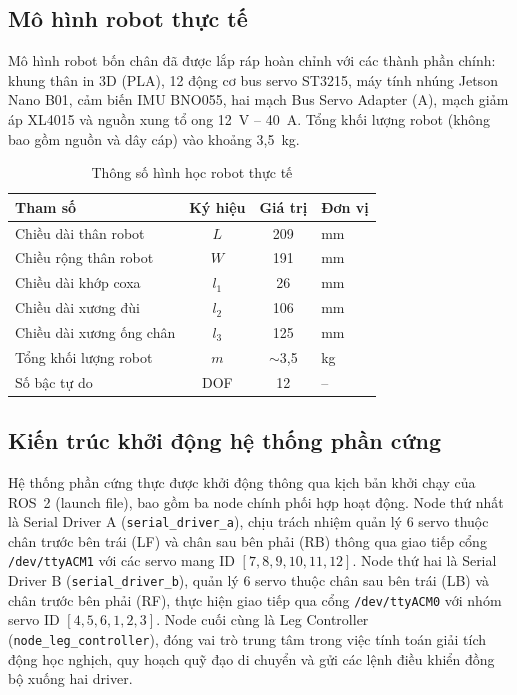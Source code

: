 \subsection{Mô hình robot thực tế}

Mô hình robot bốn chân đã được lắp ráp hoàn chỉnh với các thành phần chính: khung thân in 3D (PLA), 12 động cơ bus servo ST3215, máy tính nhúng Jetson Nano B01, cảm biến IMU BNO055, hai mạch Bus Servo Adapter (A), mạch giảm áp XL4015 và nguồn xung tổ ong 12~V -- 40~A. Tổng khối lượng robot (không bao gồm nguồn và dây cáp) vào khoảng 3{,}5~kg.

\begin{table}[H]
\centering
\caption{Thông số hình học robot thực tế}
\label{tab:hw_robot_params}
\renewcommand{\arraystretch}{1.3}
\begin{tabular}{|l|c|c|l|}
\hline
\textbf{Tham số} & \textbf{Ký hiệu} & \textbf{Giá trị} & \textbf{Đơn vị} \\ \hline
Chiều dài thân robot & $L$ & 209 & mm \\ \hline
Chiều rộng thân robot & $W$ & 191 & mm \\ \hline
Chiều dài khớp coxa & $l_1$ & 26 & mm \\ \hline
Chiều dài xương đùi & $l_2$ & 106 & mm \\ \hline
Chiều dài xương ống chân & $l_3$ & 125 & mm \\ \hline
Tổng khối lượng robot & $m$ & $\sim$3,5 & kg \\ \hline
Số bậc tự do & DOF & 12 & -- \\ \hline
\end{tabular}
\end{table}

\subsection{Kiến trúc khởi động hệ thống phần cứng}

Hệ thống phần cứng thực được khởi động thông qua kịch bản khởi chạy của ROS~2 (launch file), bao gồm ba node chính phối hợp hoạt động. Node thứ nhất là Serial Driver A (\texttt{serial\_driver\_a}), chịu trách nhiệm quản lý 6 servo thuộc chân trước bên trái (LF) và chân sau bên phải (RB) thông qua giao tiếp cổng \texttt{/dev/ttyACM1} với các servo mang ID $[7, 8, 9, 10, 11, 12]$. Node thứ hai là Serial Driver B (\texttt{serial\_driver\_b}), quản lý 6 servo thuộc chân sau bên trái (LB) và chân trước bên phải (RF), thực hiện giao tiếp qua cổng \texttt{/dev/ttyACM0} với nhóm servo ID $[4, 5, 6, 1, 2, 3]$. Node cuối cùng là Leg Controller (\texttt{node\_leg\_controller}), đóng vai trò trung tâm trong việc tính toán giải tích động học nghịch, quy hoạch quỹ đạo di chuyển và gửi các lệnh điều khiển đồng bộ xuống hai driver.

